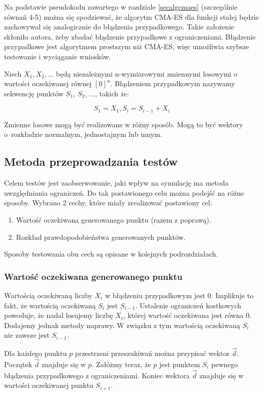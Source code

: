 \documentclass{mini}
\begin{document}
Na podstawie pseudokodu zawartego w rozdziale \ref{secalgcmaes} (szczególnie równań 4-5) można się spodziewać, że algorytm CMA-ES dla funkcji stałej będzie zachowywał się analogicznie do błądzenia przypadkowego. Takie założenie skłoniło autora, żeby zbadać błądzenie przypadkowe z ograniczeniami. Błądzenie przypadkowe jest algorytmem prostszym niż CMA-ES, więc umożliwia szybsze testowanie i wyciąganie wniosków.

Niech $ X_1, X_2, ... $ będą niezależnymi n-wymiarowymi zmiennymi losowymi o wartości oczekiwanej równej $ [0]^n $. Błądzeniem przypadkowym nazywamy sekwencję punktów $S_1$, $S_2$, ..., takich że:

\begin{equation}
S_1 = X_1, S_i=S_{i-1}+X_i
\end{equation}

Zmienne losowe mogą być realizowane w różny sposób. Mogą to być wektory o~rozkładzie normalnym, jednostajnym lub innym.

\subsection{Metoda przeprowadzania testów}
Celem testów jest zaobserwowanie, jaki wpływ na symulację ma metoda uwzględniania ograniczeń. Do tak postawionego celu można podejść na różne sposoby. Wybrano 2 cechy, które miały zrealizować postawiony cel:
\begin{enumerate}
\item Wartość oczekiwana generowanego punktu (razem z poprawą).
\item Rozkład prawdopodobieństwa generowanych punktów.
\end{enumerate}

Sposoby testowania obu cech są opisane w kolejnych podrozdziałach.

\subsubsection{Wartość oczekiwana generowanego punktu}
Wartością oczekiwaną liczby $X_i$ w błądzeniu przypadkowym jest 0. Implikuje to fakt, że wartością oczekiwaną $S_i$ jest $S_{i-1}$. Ustalenie ograniczeń kostkowych powoduje, że nadal losujemy liczbę $X_i$, której wartość oczekiwana jest równa 0. Dodajemy jednak metody naprawy. W związku z tym wartością oczekiwaną $S_i$ nie zawsze jest $S_{i-1}$.

Dla każdego punktu $p$ przestrzeni przeszukiwań można przypisać wektor $\overrightarrow{d}$. Początek $\overrightarrow{d}$ znajduje się w $p$. Załóżmy teraz, że $p$ jest punktem $S_i$ pewnego błądzenia przypadkowego z ograniczeniami. Koniec wektora $\overrightarrow{d}$ znajduje się w wartości oczekiwanej punktu $S_{i+1}$.
\end{document}
